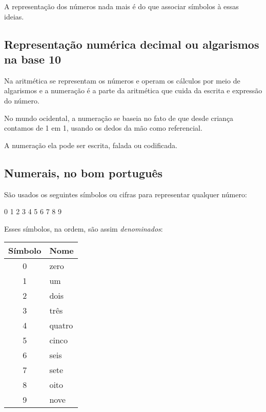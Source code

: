 A representação dos números nada mais é do que associar símbolos à essas ideias.\

\subsection{Representação numérica decimal ou algarismos na base 10}

Na aritmética se representam os números e operam os cálculos por meio de algarismos e a numeração é a parte da aritmética que cuida da escrita e expressão do número.\

No mundo ocidental, a numeração se baseia no fato de que desde criança contamos de 1 em 1, usando  os dedos da mão como referencial.

A numeração ela pode ser escrita, falada ou codificada.

\subsection{Numerais, no bom português}

São usados os seguintes símbolos ou cifras para representar qualquer número:

\begin{center}
    0 1 2 3 4 5 6 7 8 9
\end{center}

Esses símbolos, na ordem, são assim \textit{denominados}:

\begin{center}
    \begin{tabular}{|c|l|}
        \hline
        Símbolo & Nome \\
        \hline
        0 & zero \\
        \hline
        1 & um \\
        \hline
        2 & dois \\
        \hline
        3 & três \\
        \hline
        4 & quatro \\
        \hline
        5 & cinco \\
        \hline
        6 & seis \\
        \hline
        7 & sete \\
        \hline
        8 & oito \\
        \hline
        9 & nove \\
        \hline
    \end{tabular}
\end{center}


